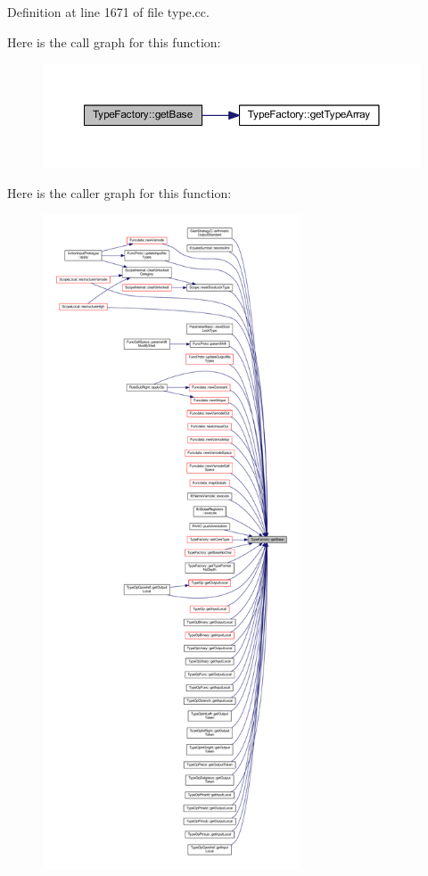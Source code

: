 Definition at line 1671 of file type.\+cc.

Here is the call graph for this function\+:
\nopagebreak
\begin{figure}[H]
\begin{center}
\leavevmode
\includegraphics[width=350pt]{class_type_factory_a5fe1ae26c0b76b18d59d5cd27a9b8ff1_cgraph}
\end{center}
\end{figure}
Here is the caller graph for this function\+:
\nopagebreak
\begin{figure}[H]
\begin{center}
\leavevmode
\includegraphics[height=550pt]{class_type_factory_a5fe1ae26c0b76b18d59d5cd27a9b8ff1_icgraph}
\end{center}
\end{figure}
\mbox{\label{class_type_factory_a2848b5923834b755de0749d9f96880e1}} 
